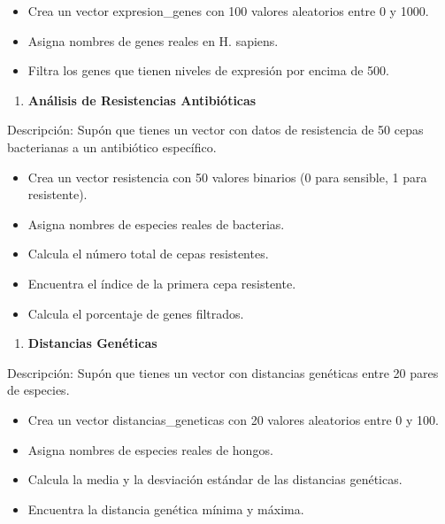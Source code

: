 \documentclass[
]{book}
\providecommand{\tightlist}{%
  \setlength{\itemsep}{0pt}\setlength{\parskip}{0pt}}
\begin{document}
\begin{itemize}
\tightlist
\item
  Crea un vector expresion\_genes con 100 valores aleatorios entre 0 y 1000.
\item
  Asigna nombres de genes reales en H. sapiens.
\item
  Filtra los genes que tienen niveles de expresión por encima de 500.
\end{itemize}

\begin{enumerate}
\def\labelenumi{\arabic{enumi}.}
\setcounter{enumi}{1}
\tightlist
\item
  \textbf{Análisis de Resistencias Antibióticas}
\end{enumerate}

Descripción: Supón que tienes un vector con datos de resistencia de 50 cepas bacterianas a un antibiótico específico.

\begin{itemize}
\tightlist
\item
  Crea un vector resistencia con 50 valores binarios (0 para sensible, 1 para resistente).
\item
  Asigna nombres de especies reales de bacterias.
\item
  Calcula el número total de cepas resistentes.
\item
  Encuentra el índice de la primera cepa resistente.
\item
  Calcula el porcentaje de genes filtrados.
\end{itemize}

\begin{enumerate}
\def\labelenumi{\arabic{enumi}.}
\setcounter{enumi}{2}
\tightlist
\item
  \textbf{Distancias Genéticas}
\end{enumerate}

Descripción: Supón que tienes un vector con distancias genéticas entre 20 pares de especies.

\begin{itemize}
\tightlist
\item
  Crea un vector distancias\_geneticas con 20 valores aleatorios entre 0 y 100.
\item
  Asigna nombres de especies reales de hongos.
\item
  Calcula la media y la desviación estándar de las distancias genéticas.
\item
  Encuentra la distancia genética mínima y máxima.
\end{itemize}
\end{document}
